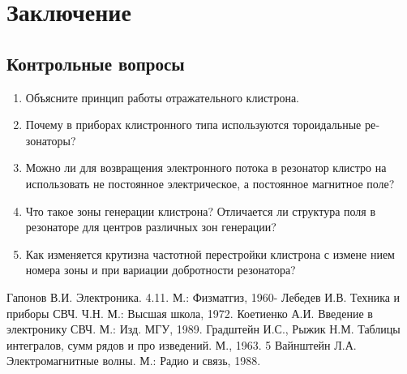 \section{Заключение}
\subsection{Контрольные вопросы}

\begin{enumerate}
	\item Объясните принцип работы отражательного клистрона.
	\item Почему в приборах клистронного типа используются тороидальные ре­
	зонаторы?
	\item Можно ли для возвращения электронного потока в резонатор клистро­
	на использовать не постоянное электрическое, а постоянное магнитное поле?
	\item Что такое зоны генерации клистрона? Отличается ли структура поля
	в резонаторе для центров различных зон генерации?
	\item Как изменяется крутизна частотной перестройки клистрона с измене­
	нием номера зоны и при вариации добротности резонатора?
\end{enumerate}

\begin{thebibliography}{}
	  Гапонов В.И. Электроника. 4.11. М.: Физматгиз, 1960-
	  Лебедев И.В. Техника и приборы СВЧ. Ч.Н. М.: Высшая школа, 1972.
	  Коетиенко А.И. Введение в электронику СВЧ. М.: Изд. МГУ, 1989.
	  Градштейн И.С., Рыжик Н.М. Таблицы интегралов, сумм рядов и про­
	изведений. М., 1963. 5
	  Вайнштейн Л.А. Электромагнитные волны. М.: Радио и связь, 1988.
\end{thebibliography}
